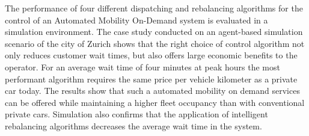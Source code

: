 The performance of four different dispatching and rebalancing algorithms for the
control of an Automated Mobility On-Demand system is evaluated in a simulation environment.
The case study conducted on an agent-based simulation scenario of the city of Zurich
shows that the right choice of control algorithm not only reduces customer wait
times, but also offers large economic benefits to the operator. For an average
wait time of four minutes at peak hours the most performant algorithm requires the same price
per vehicle kilometer as a private car today.
The results show that such a automated mobility on demand services can be offered
while maintaining a higher fleet occupancy than with conventional private cars. Simulation
also confirms that the application of intelligent rebalancing algorithms decreases
the average wait time in the system.

